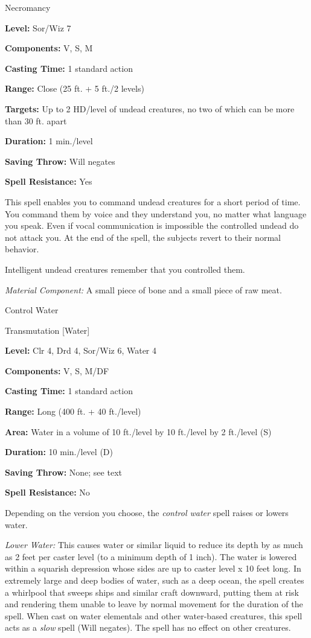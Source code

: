 \documentclass{article}
\begin{document}
Necromancy

\textbf{Level:} Sor/Wiz 7

\textbf{Components:} V, S, M

\textbf{Casting Time:} 1 standard action

\textbf{Range:} Close (25 ft. + 5 ft./2 levels)

\textbf{Targets:} Up to 2 HD/level of undead creatures, no two of which can be 
more than 30 ft. apart

\textbf{Duration:} 1 min./level

\textbf{Saving Throw: }Will negates

\textbf{Spell Resistance:} Yes

This spell enables you to command undead creatures for a short period of time. 
You command them by voice and they understand you, no matter what language you 
speak. Even if vocal communication is impossible the controlled undead do not attack 
you. At the end of the spell, the subjects revert to their normal behavior.

Intelligent undead creatures remember that you controlled them.

\textit{Material Component: }A small piece of bone and a small piece of raw meat.

\vspace{12pt}
Control Water

Transmutation [Water]

\textbf{Level:} Clr 4, Drd 4, Sor/Wiz 6, Water 4

\textbf{Components:} V, S, M/DF

\textbf{Casting Time:} 1 standard action

\textbf{Range:} Long (400 ft. + 40 ft./level)

\textbf{Area: }Water in a volume of 10 ft./level by 10 ft./level by 2 ft./level 
(S)

\textbf{Duration:} 10 min./level (D)

\textbf{Saving Throw:} None; see text

\textbf{Spell Resistance:} No

Depending on the version you choose, the \textit{control water }spell raises or 
lowers water.

\textit{Lower Water: }This causes water or similar liquid to reduce its depth by 
as much as 2 feet per caster level (to a minimum depth of 1 inch). The water is 
lowered within a squarish depression whose sides are up to caster level x 10 feet 
long. In extremely large and deep bodies of water, such as a deep ocean, the spell 
creates a whirlpool that sweeps ships and similar craft downward, putting them 
at risk and rendering them unable to leave by normal movement for the duration 
of the spell. When cast on water elementals and other water-based creatures, this 
spell acts as a \textit{slow }spell (Will negates). The spell has no effect on 
other creatures.
\end{document}
